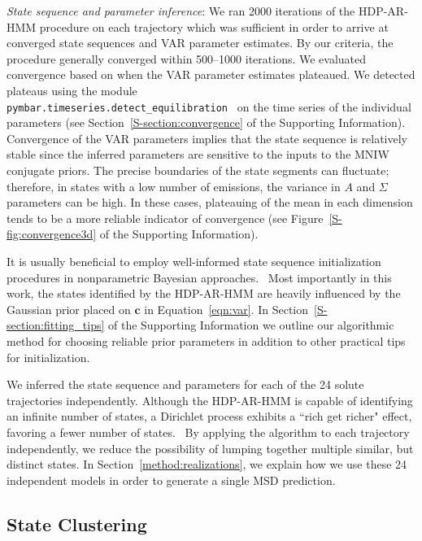 \documentclass[journal=jpcbfk,manuscript=article]{achemso}
\begin{document}
  \textit{State sequence and parameter inference}: We ran 2000 iterations of the
  HDP-AR-HMM procedure on each trajectory which was sufficient in order to arrive
  at converged state sequences and VAR parameter estimates. By our criteria, the 
  procedure generally converged within 500--1000 iterations. We evaluated 
  convergence based on when the VAR parameter estimates plateaued. We detected 
  plateaus using the module \\ \texttt{pymbar.timeseries.detect\_equilibration}~\cite{chodera_simple_2016} 
  on the time series of the individual parameters (see Section~\ref{S-section:convergence}
  of the Supporting Information). Convergence of the VAR parameters implies that
  the state sequence is relatively stable since the inferred parameters are 
  sensitive to the inputs to the MNIW conjugate priors. The precise boundaries of 
  the state segments can fluctuate; therefore, in states with a low number of 
  emissions, the variance in $A$ and $\Sigma$ parameters can be high. In these 
  cases, plateauing of the mean in each dimension tends to be a more reliable 
  indicator of convergence (see Figure~\ref{S-fig:convergence3d} of the Supporting
  Information).
  
  It is usually beneficial to employ well-informed state sequence initialization 
  procedures in nonparametric Bayesian approaches.~\cite{fox_bayesian_2010}
  Most importantly in this work, the states identified by the HDP-AR-HMM are heavily 
  influenced by the Gaussian prior placed on $\mathbf{c}$ in Equation~\ref{eqn:var}. In 
  Section~\ref{S-section:fitting_tips} of the Supporting Information we outline our 
  algorithmic method for choosing reliable prior parameters in addition to other 
  practical tips for initialization.

  We inferred the state sequence and parameters for each of the 24 solute 
  trajectories independently. Although the HDP-AR-HMM is capable of identifying 
  an infinite number of states, a Dirichlet process exhibits a ``rich get richer" 
  effect, favoring a fewer number of states.~\cite{dreyer_discovering_2011}
  By applying the algorithm to each trajectory independently, we reduce the 
  possibility of lumping together multiple similar, but distinct states. In 
  Section~\ref{method:realizations}, we explain how we use these 24 independent
  models in order to generate a single MSD prediction.  
  
  \subsection{State Clustering}\label{method:clustering}  
\end{document}
